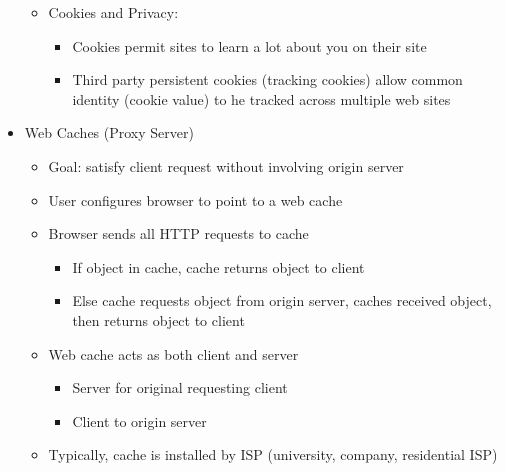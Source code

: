 \begin{itemize}
\begin{itemize}
      \item Cookies and Privacy:

        \begin{itemize}

          \item Cookies permit sites to learn a lot about you on their site

          \item Third party persistent cookies (tracking cookies) allow common identity (cookie value) to he tracked across multiple web sites

        \end{itemize}

    \end{itemize}

  \item Web Caches (Proxy Server)

    \begin{itemize}

      \item Goal: satisfy client request without involving origin server

      \item User configures browser to point to a web cache

      \item Browser sends all HTTP requests to cache

        \begin{itemize}

          \item If object in cache, cache returns object to client

          \item Else cache requests object from origin server, caches received object, then returns object to client

        \end{itemize}

      \item Web cache acts as both client and server

        \begin{itemize}

          \item Server for original requesting client

          \item Client to origin server

        \end{itemize}

      \item Typically, cache is installed by ISP (university, company, residential ISP)


\end{itemize}
\end{itemize}
